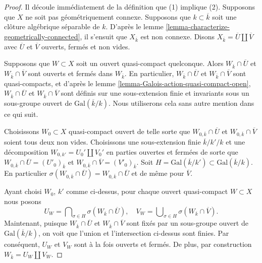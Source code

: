 \begin{proof}
Il découle immédiatement de la définition que (1)
implique (2). Supposons que $X$ ne soit pas
géométriquement connexe. Supposons que $k \subset
\overline{k}$ soit une clôture algébrique séparable de $k$.
D'après le lemme
\ref{lemma-characterize-geometrically-connected}, il s'ensuit que
$X_{\overline{k}}$ est non connexe. Disons $X_{\overline{k}} = \overline{U} \amalg
\overline{V}$ avec $\overline{U}$ et $\overline{V}$ ouverts, fermés et non vides.

\medskip\noindent
Supposons que $W \subset X$ soit un ouvert quasi-compact
quelconque. Alors $W_{\overline{k}} \cap \overline{U}$ et
$W_{\overline{k}} \cap \overline{V}$ sont ouverts et
fermés dans $W_{\overline{k}}$. En particulier,
$W_{\overline{k}} \cap \overline{U}$ et $W_{\overline{k}}
\cap \overline{V}$ sont quasi-compacts, et d'après le lemme
\ref{lemma-Galois-action-quasi-compact-open},
$W_{\overline{k}} \cap \overline{U}$ et $W_{\overline{k}} \cap
\overline{V}$ sont définis sur une sous-extension finie et
invariants sous un sous-groupe ouvert de
$\text{Gal}(\overline{k}/k)$. Nous utiliserons cela sans autre mention dans ce qui suit.

\medskip\noindent
Choisissons $W_0 \subset X$ quasi-compact ouvert de
telle sorte que $W_{0, \overline{k}} \cap
\overline{U}$ et $W_{0, \overline{k}} \cap
\overline{V}$ soient tous deux non vides. Choisissons
une sous-extension finie $\overline{k}/k'/k$ et une
décomposition $W_{0, k'} = U_0' \amalg V_0'$ en
parties ouvertes et fermées de sorte que $W_{0,
\overline{k}} \cap \overline{U} =
(U'_0)_{\overline{k}}$ et $W_{0, \overline{k}} \cap
\overline{V} = (V'_0)_{\overline{k}}$. Soit $H =
\text{Gal}(\overline{k}/k') \subset \text{Gal}(\overline{k}/k)$.
En particulier $\sigma(W_{0, \overline{k}} \cap \overline{U}) =
W_{0, \overline{k}} \cap \overline{U}$ et de même pour $\overline{V}$.

\medskip\noindent
Ayant choisi $W_0$, $k'$ comme ci-dessus, pour
chaque ouvert quasi-compact $W \subset X$ nous posons
$$
U_W =
\bigcap\nolimits_{\sigma \in H} \sigma(W_{\overline{k}} \cap \overline{U}),
\quad
V_W =
\bigcup\nolimits_{\sigma \in H} \sigma(W_{\overline{k}} \cap \overline{V}).
$$
Maintenant, puisque $W_{\overline{k}} \cap \overline{U}$ et
$W_{\overline{k}} \cap \overline{V}$ sont fixés par un sous-groupe ouvert
de $\text{Gal}(\overline{k}/k)$, on voit que l'union et
l'intersection ci-dessus sont finies. Par conséquent, $U_W$ et $V_W$ sont à la
fois ouverts et fermés. De plus, par construction $W_{\bar k} = U_W \amalg V_W$.


\end{proof}
